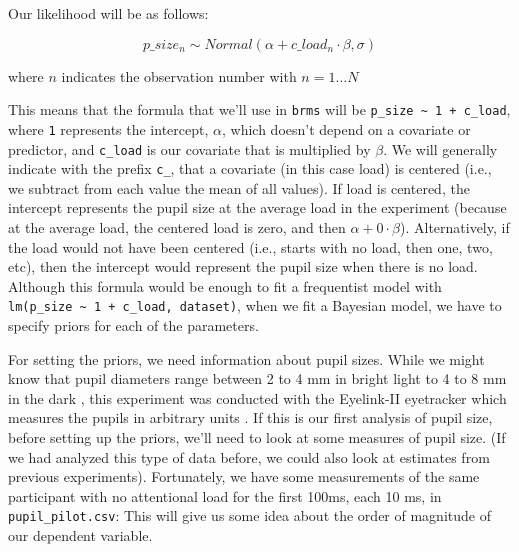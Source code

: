 \documentclass[12pt,]{krantz}
\newenvironment{Shaded}{\begin{snugshade}}{\end{snugshade}}
\newcommand{\KeywordTok}[1]{\textcolor[rgb]{0.13,0.29,0.53}{\textbf{#1}}}
\newcommand{\StringTok}[1]{\textcolor[rgb]{0.31,0.60,0.02}{#1}}
\newcommand{\OperatorTok}[1]{\textcolor[rgb]{0.81,0.36,0.00}{\textbf{#1}}}
\newcommand{\NormalTok}[1]{#1}
\theoremstyle{definition}
\theoremstyle{definition}
\theoremstyle{definition}
\theoremstyle{remark}
\begin{document}
Our likelihood will be as follows:

\begin{equation}
p\_size_n \sim Normal(\alpha + c\_load_n \cdot \beta,\sigma)
\end{equation}

where \(n\) indicates the observation number with \(n = 1 \ldots N\)

This means that the formula that we'll use in \texttt{brms} will be
\texttt{p\_size\ \textasciitilde{}\ 1\ +\ c\_load}, where \texttt{1}
represents the intercept, \(\alpha\), which doesn't depend on a
covariate or predictor, and \texttt{c\_load} is our covariate that is
multiplied by \(\beta\). We will generally indicate with the prefix
\texttt{c\_}, that a covariate (in this case load) is centered (i.e., we
subtract from each value the mean of all values). If load is centered,
the intercept represents the pupil size at the average load in the
experiment (because at the average load, the centered load is zero, and
then \(\alpha + 0 \cdot \beta\)). Alternatively, if the load would not
have been centered (i.e., starts with no load, then one, two, etc), then
the intercept would represent the pupil size when there is no load.
Although this formula would be enough to fit a frequentist model with
\texttt{lm(p\_size\ \textasciitilde{}\ 1\ +\ c\_load,\ dataset)}, when
we fit a Bayesian model, we have to specify priors for each of the
parameters.

For setting the priors, we need information about pupil sizes. While we
might know that pupil diameters range between 2 to 4 mm in bright light
to 4 to 8 mm in the dark \citep{spectorPupils1990}, this experiment was
conducted with the Eyelink-II eyetracker which measures the pupils in
arbitrary units \citep{hayesMappingCorrectingInfluence2016}. If this is
our first analysis of pupil size, before setting up the priors, we'll
need to look at some measures of pupil size. (If we had analyzed this
type of data before, we could also look at estimates from previous
experiments). Fortunately, we have some measurements of the same
participant with no attentional load for the first 100ms, each 10 ms, in
\texttt{pupil\_pilot.csv}: This will give us some idea about the order
of magnitude of our dependent variable.

\begin{Shaded}
\end{Shaded}
\end{document}
